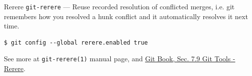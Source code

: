 \begin{frame}[fragile]{Rerere}
  \texttt{git-rerere} --- Reuse recorded resolution of conflicted merges, i.e. git remembers how you resolved a hunk conflict and it automatically resolves it next time.\\[1em]

  \begin{lstlisting}[style=bash]
    $ git config --global rerere.enabled true
  \end{lstlisting}

  \vfill
  See more at \texttt{git-rerere(1)} manual page, and \href{https://git-scm.com/book/en/v2/Git-Tools-Rerere}{\underline{Git Book, Sec. 7.9 Git Tools - Rerere}}.
\end{frame}

